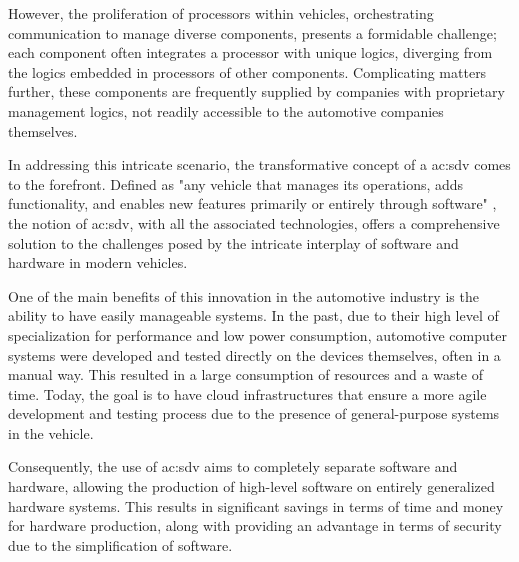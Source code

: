 However, the proliferation of processors within vehicles, orchestrating communication to manage diverse components, presents a formidable challenge; each component often integrates a processor with unique logics, diverging from the logics embedded in processors of other components. Complicating matters further, these components are frequently supplied by companies with proprietary management logics, not readily accessible to the automotive companies themselves.

In addressing this intricate scenario, the transformative concept of a \gls{ac:sdv} comes to the forefront. Defined as "any vehicle that manages its operations, adds functionality, and enables new features primarily or entirely through software"  \cite{blackberrySDV}, the notion of \gls{ac:sdv}, with all the associated technologies, offers a comprehensive solution to the challenges posed by the intricate interplay of software and hardware in modern vehicles.

One of the main benefits of this innovation in the automotive industry is the ability to have easily manageable systems. In the past, due to their high level of specialization for performance and low power consumption, automotive computer systems were developed and tested directly on the devices themselves, often in a manual way. This resulted in a large consumption of resources and a waste of time. Today, the goal is to have cloud infrastructures that ensure a more agile development and testing process due to the presence of general-purpose systems in the vehicle.

Consequently, the use of \gls{ac:sdv} aims to completely separate software and hardware, allowing the production of high-level software on entirely generalized hardware systems. This results in significant savings in terms of time and money for hardware production, along with providing an advantage in terms of security due to the simplification of software.

